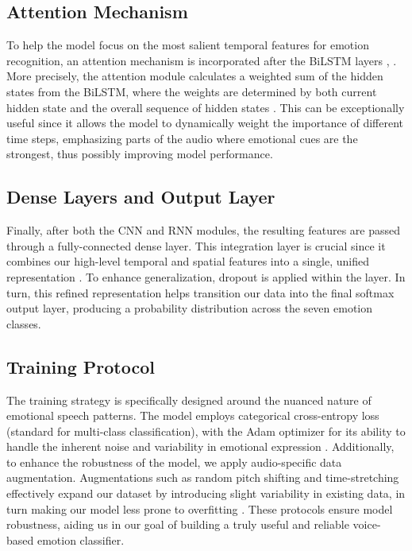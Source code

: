 \documentclass[../main.tex]{subfiles}
\begin{document}
\subsection{Attention Mechanism}
To help the model focus on the most salient temporal features for emotion
recognition, an attention mechanism is incorporated after the BiLSTM layers \citep{Peng2020}, \citep{Chen2018}.
More precisely, the attention module calculates a weighted sum of the hidden
states from the BiLSTM, where the weights are determined by both current hidden
state and the overall sequence of hidden states \citep{Chen2018}. This can be exceptionally
useful since it allows the model to dynamically weight the importance of
different time steps, emphasizing parts of the audio where emotional cues are
the strongest, thus possibly improving model performance.

\subsection{Dense Layers and Output Layer}
Finally, after both the CNN and RNN modules, the resulting features are passed
through a fully-connected dense layer. This integration layer is crucial since
it combines our high-level temporal and spatial features into a single, unified
representation \citep{Chen2018}. To enhance generalization, dropout is applied within the layer.
In turn, this refined representation helps transition our data into the final
softmax output layer, producing a probability distribution across the seven
emotion classes.

\subsection{Training Protocol}
The training strategy is specifically designed around the nuanced nature of
emotional speech patterns. The model employs categorical cross-entropy loss
(standard for multi-class classification), with the Adam optimizer for its
ability to handle the inherent noise and variability in emotional expression \citep{Bhatlawande2024}.
Additionally, to enhance the robustness of the model, we apply audio-specific
data augmentation. Augmentations such as random pitch shifting and
time-stretching effectively expand our dataset by introducing slight variability
in existing data, in turn making our model less prone to overfitting \citep{Bhatlawande2024}. These protocols ensure model robustness, aiding us in our goal of building a truly useful and reliable voice-based emotion classifier.
\end{document}

